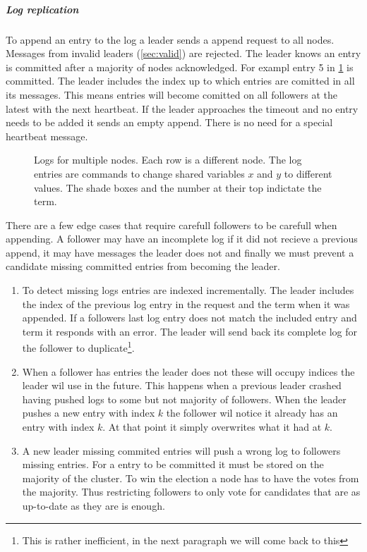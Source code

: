 \subparagraph{Log replication}
To append an entry to the log a leader sends a append request to all nodes. Messages from invalid leaders (\cref{sec:valid}) are rejected. The leader knows an entry is committed after a majority of nodes acknowledged. For exampl entry 5 in \cref{fig:raft_entries} is committed. The leader includes the index up to which entries are comitted in all its messages. This means entries will become comitted on all followers at the latest with the next heartbeat. If the leader approaches the timeout and no entry needs to be added it sends an empty append. There is no need for a special heartbeat message.

\begin{figure}[htbp]
	\centering
	
	\caption{Logs for multiple nodes. Each row is a different node. The log entries are commands to change shared variables $x$ and $y$ to different values. The shade boxes and the number at their top indictate the term.}
	\label{fig:raft_entries}
\end{figure}

There are a few edge cases that require carefull followers to be carefull when appending. A follower may have an incomplete log if it did not recieve a previous append, it may have messages the leader does not and finally we must prevent a candidate missing committed entries from becoming the leader.
%
\begin{enumerate}
	\item To detect missing logs entries are indexed incrementally. The leader includes the index of the previous log entry in the request and the term when it was appended. If a followers last log entry does not match the included entry and term it responds with an error. The leader will send back its complete log for the follower to duplicate\footnote{This is rather inefficient, in the next paragraph we will come back to this}.
	\item When a follower has entries the leader does not these will occupy indices the leader wil use in the future. This happens when a previous leader crashed having pushed logs to some but not majority of followers. When the leader pushes a new entry with index $k$ the follower wil notice it already has an entry with index $k$. At that point it simply overwrites what it had at $k$.
	\item A new leader missing commited entries will push a wrong log to followers missing entries. For a entry to be committed it must be stored on the majority of the cluster. To win the election a node has to have the votes from the majority. Thus restricting followers to only vote for candidates that are as up-to-date as they are is enough.
\end{enumerate}


